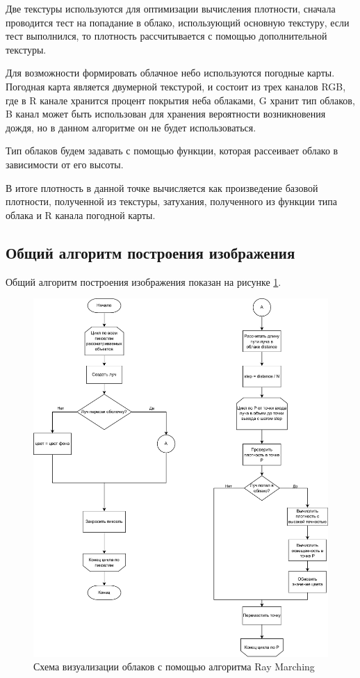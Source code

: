 Две текстуры используются для оптимизации вычисления плотности, сначала проводится тест на попадание в облако, использующий основную текстуру, если тест выполнился, то плотность рассчитывается с помощью дополнительной текстуры.

Для возможности формировать облачное небо используются погодные карты. Погодная карта является двумерной текстурой, и состоит из трех каналов RGB, где в R канале хранится процент покрытия неба облаками, G хранит тип облаков, B канал может быть использован для хранения вероятности возникновения дождя, но в данном алгоритме он не будет использоваться. 

Тип облаков будем задавать с помощью функции, которая рассеивает облако в зависимости от его высоты. 

В итоге плотность в данной точке вычисляется как произведение базовой плотности, полученной из текстуры, затухания, полученного из функции типа облака и R канала погодной карты. 

\subsection{Общий алгоритм построения изображения}

Общий алгоритм построения изображения показан на рисунке \ref{fig:renderscheme}.

\begin{figure}
	\centering
	\includegraphics[width=1\textwidth]{assets/img/renderscheme.pdf} %
	\caption{Схема визуализации облаков с помощью алгоритма Ray Marching}
	\label{fig:renderscheme}
\end{figure}

